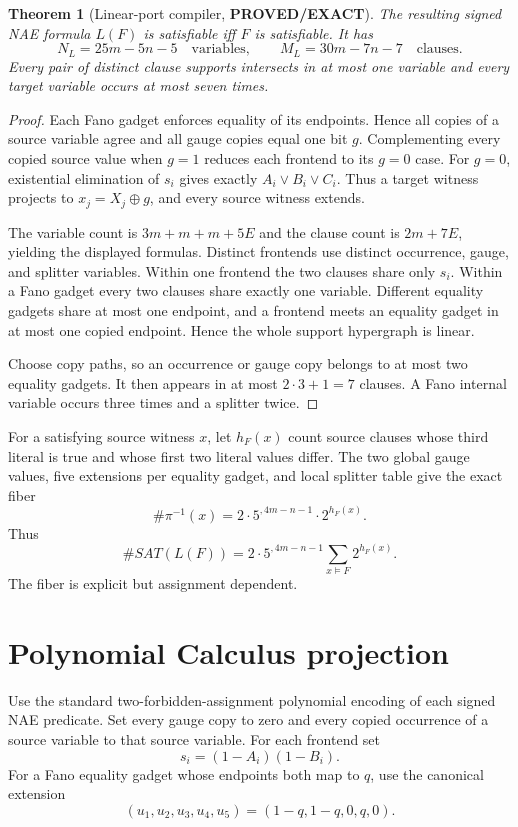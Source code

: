 \documentclass[11pt]{article}
\newtheorem{theorem}{Theorem}
\newcommand{\EXACT}{\textbf{PROVED/EXACT}}
\begin{document}
\begin{theorem}[Linear-port compiler, \EXACT]
The resulting signed NAE formula $L(F)$ is satisfiable iff $F$ is satisfiable.
It has
\[
\boxed{N_L=25m-5n-5}\quad\text{variables},\qquad
\boxed{M_L=30m-7n-7}\quad\text{clauses}.
\]
Every pair of distinct clause supports intersects in at most one variable and
every target variable occurs at most seven times.
\end{theorem}
\begin{proof}
Each Fano gadget enforces equality of its endpoints.  Hence all copies of a
source variable agree and all gauge copies equal one bit $g$.  Complementing
every copied source value when $g=1$ reduces each frontend to its $g=0$ case.
For $g=0$, existential elimination of $s_i$ gives exactly
$A_i\vee B_i\vee C_i$.  Thus a target witness projects to
$x_j=X_j\oplus g$, and every source witness extends.

The variable count is $3m+m+m+5E$ and the clause count is $2m+7E$, yielding
the displayed formulas.  Distinct frontends use distinct occurrence, gauge,
and splitter variables.  Within one frontend the two clauses share only
$s_i$.  Within a Fano gadget every two clauses share exactly one variable.
Different equality gadgets share at most one endpoint, and a frontend meets
an equality gadget in at most one copied endpoint.  Hence the whole support
hypergraph is linear.

Choose copy paths, so an occurrence or gauge copy belongs to at most two
equality gadgets.  It then appears in at most $2\cdot3+1=7$ clauses.  A Fano
internal variable occurs three times and a splitter twice.
\end{proof}

For a satisfying source witness $x$, let $h_F(x)$ count source clauses whose
third literal is true and whose first two literal values differ.  The two
global gauge values, five extensions per equality gadget, and local splitter
table give the exact fiber
\[
\boxed{\#\pi^{-1}(x)=2\cdot5^{,4m-n-1}\cdot2^{h_F(x)}}.
\]
Thus
\[
\#SAT(L(F))=2\cdot5^{,4m-n-1}
\sum_{x\models F}2^{h_F(x)}.
\]
The fiber is explicit but assignment dependent.

\section{Polynomial Calculus projection}
Use the standard two-forbidden-assignment polynomial encoding of each signed
NAE predicate.  Set every gauge copy to zero and every copied occurrence of a
source variable to that source variable.  For each frontend set
\[
s_i=(1-A_i)(1-B_i).
\]
For a Fano equality gadget whose endpoints both map to $q$, use the canonical
extension
\[
(u_1,u_2,u_3,u_4,u_5)=(1-q,1-q,0,q,0).
\]
\end{document}
